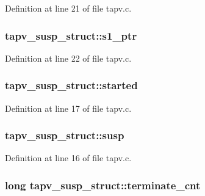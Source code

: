Definition at line 21 of file tapv.\+c.

\subsubsection[{\texorpdfstring{s1\+\_\+ptr}{s1_ptr}}]{ tapv\+\_\+susp\+\_\+struct\+::s1\+\_\+ptr}\hypertarget{structtapv__susp__struct_a69182c04ac0342dfdb609ccd34162a09}{}\label{structtapv__susp__struct_a69182c04ac0342dfdb609ccd34162a09}


Definition at line 22 of file tapv.\+c.

\subsubsection[{\texorpdfstring{started}{started}}]{ tapv\+\_\+susp\+\_\+struct\+::started}\hypertarget{structtapv__susp__struct_a561624dfd751cc0747a3fbc15265c004}{}\label{structtapv__susp__struct_a561624dfd751cc0747a3fbc15265c004}


Definition at line 17 of file tapv.\+c.

\subsubsection[{\texorpdfstring{susp}{susp}}]{ tapv\+\_\+susp\+\_\+struct\+::susp}\hypertarget{structtapv__susp__struct_a2deff035fe195348874f1efc855d6bd4}{}\label{structtapv__susp__struct_a2deff035fe195348874f1efc855d6bd4}


Definition at line 16 of file tapv.\+c.

\subsubsection[{\texorpdfstring{terminate\+\_\+cnt}{terminate_cnt}}]{\setlength{\rightskip}{0pt plus 5cm}long tapv\+\_\+susp\+\_\+struct\+::terminate\+\_\+cnt}\hypertarget{structtapv__susp__struct_ad78fc6646af821819a9fecb85f788f49}{}\label{structtapv__susp__struct_ad78fc6646af821819a9fecb85f788f49}


